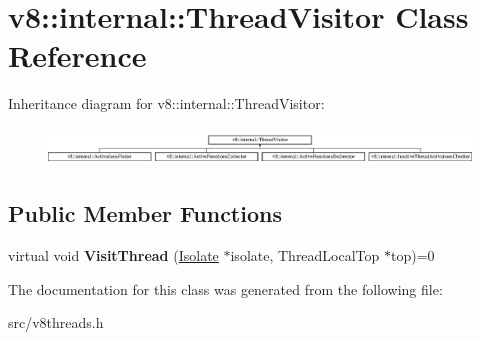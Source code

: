 \hypertarget{classv8_1_1internal_1_1_thread_visitor}{}\section{v8\+:\+:internal\+:\+:Thread\+Visitor Class Reference}
\label{classv8_1_1internal_1_1_thread_visitor}
Inheritance diagram for v8\+:\+:internal\+:\+:Thread\+Visitor\+:\begin{figure}[H]
\begin{center}
\leavevmode
\includegraphics[height=0.992908cm]{classv8_1_1internal_1_1_thread_visitor}
\end{center}
\end{figure}
\subsection*{Public Member Functions}
\begin{DoxyCompactItemize}
\item 
\hypertarget{classv8_1_1internal_1_1_thread_visitor_a1be34c6a86e87d00a507c5b7bf0652fe}{}virtual void {\bfseries Visit\+Thread} (\hyperlink{classv8_1_1internal_1_1_isolate}{Isolate} $\ast$isolate, Thread\+Local\+Top $\ast$top)=0\label{classv8_1_1internal_1_1_thread_visitor_a1be34c6a86e87d00a507c5b7bf0652fe}

\end{DoxyCompactItemize}


The documentation for this class was generated from the following file\+:\begin{DoxyCompactItemize}
\item 
src/v8threads.\+h\end{DoxyCompactItemize}
